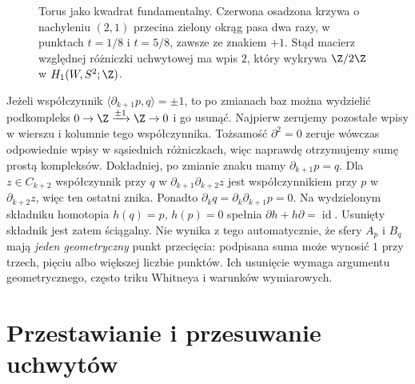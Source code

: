 \begin{figure}[htbp]
\centering
{}
\caption{Torus jako kwadrat fundamentalny.
Czerwona osadzona krzywa o nachyleniu $(2,1)$
przecina zielony okrąg pasa dwa razy,
w punktach $t=1/8$ i $t=5/8$, zawsze ze znakiem $+1$.
Stąd macierz względnej różniczki uchwytowej ma wpis $2$,
który wykrywa $\Z/2\Z$ w $H_1(W,S^2;\Z)$.}
\label{fig:uchwyty-torsja-sfera-sfera-24}
\end{figure}

\begin{uwaga}
Jeżeli współczynnik
$\langle\partial_{k+1}p,q\rangle=\pm1$,
to po zmianach baz można wydzielić podkompleks
$0\to\Z\xrightarrow{\pm1}\Z\to0$ i go usunąć.
Najpierw zerujemy pozostałe wpisy w wierszu i kolumnie
tego współczynnika. Tożsamość $\partial^2=0$
zeruje wówczas odpowiednie wpisy w sąsiednich
różniczkach, więc naprawdę otrzymujemy sumę prostą
kompleksów. Dokładniej, po zmianie znaku mamy
$\partial_{k+1}p=q$. Dla $z\in C_{k+2}$ współczynnik przy $q$
w $\partial_{k+1}\partial_{k+2}z$ jest współczynnikiem przy $p$
w $\partial_{k+2}z$, więc ten ostatni znika.
Ponadto $\partial_k q=\partial_k\partial_{k+1}p=0$.
Na wydzielonym składniku homotopia $h(q)=p$, $h(p)=0$
spełnia $\partial h+h\partial=\operatorname{id}$.
Usunięty składnik jest zatem ściągalny.
Nie wynika z tego automatycznie, że
sfery $A_p$ i $B_q$ mają \emph{jeden
geometryczny} punkt przecięcia:
podpisana suma może wynosić $1$
przy trzech, pięciu albo większej
liczbie punktów. Ich usunięcie wymaga
argumentu geometrycznego, często
triku Whitneya i warunków wymiarowych.
\end{uwaga}

\section{Przestawianie i przesuwanie uchwytów}
\label{sec:ruchy-uchwytow-18}

